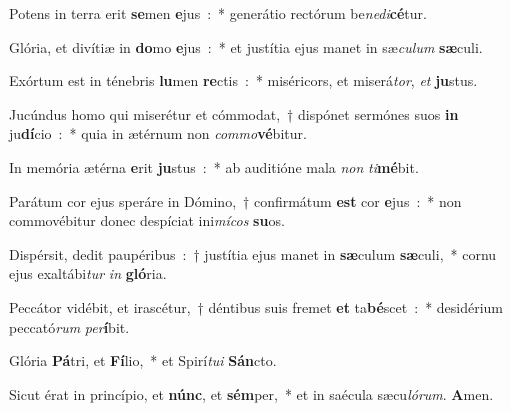 ﻿\item Potens in terra erit \textbf{se}\-men \textbf{e}\-jus~:~* generátio rectórum be\emph{ne}\-\emph{di}\-\textbf{cé}\-tur.
\item Glória, et divítiæ in \textbf{do}\-mo \textbf{e}\-jus~:~* et justítia ejus manet in sæ\emph{cu}\-\emph{lum} \textbf{sæ}\-culi.
\item Exórtum est in ténebris \textbf{lu}\-men \textbf{re}\-ctis~:~* miséricors, et miserá\emph{tor}, \emph{et} \textbf{ju}\-stus.
\item Jucúndus homo qui miserétur et cómmodat,~† dispónet sermónes suos \textbf{in} ju\textbf{dí}\-cio~:~* quia in ætérnum non \emph{com}\-\emph{mo}\-\textbf{vé}\-bitur.
\item In memória ætérna \textbf{e}\-rit \textbf{ju}\-stus~:~* ab auditióne mala \emph{non} \emph{ti}\-\textbf{mé}\-bit.
\item Parátum cor ejus speráre in Dómino,~† confirmátum \textbf{est} cor \textbf{e}\-jus~:~* non commovébitur donec despíciat ini\emph{mí}\-\emph{cos} \textbf{su}\-os.
\item Dispérsit, dedit paupéribus~:~† justítia ejus manet in \textbf{sæ}\-culum \textbf{sæ}\-culi,~* cornu ejus exaltábi\emph{tur} \emph{in} \textbf{gló}\-ria.
\item Peccátor vidébit, et irascétur,~† déntibus suis fremet \textbf{et} ta\textbf{bé}\-scet~:~* desidérium peccató\emph{rum} \emph{per}\-\textbf{í}\-bit.
\item Glória \textbf{Pá}\-tri, et \textbf{Fí}\-lio,~* et Spirí\emph{tu}\-\emph{i} \textbf{Sán}\-cto.
\item Sicut érat in princípio, et \textbf{núnc}, et \textbf{sém}\-per,~* et in saécula sæcu\emph{ló}\-\emph{rum}. \textbf{A}\-men.
